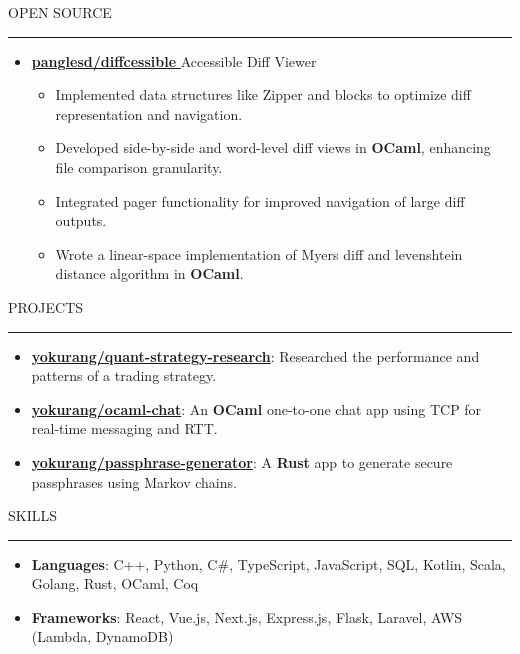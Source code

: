 \documentclass[letterpaper, 11pt]{article}
\def\sectionlineskip{\medskip}
\def\sectionskip{\medskip}
\def \entryspacing {-0pt}
\newcommand{\SectionHeading}[1]{
  \sectionskip
  \raggedright\raggedbottom\MakeUppercase{\large{#1}}
  \sectionlineskip
  \hrule
  \color{black}
}
\newcommand{\ResumeItem}[2]{
  \item{
    \textbf{#1}{: #2 \vspace{-2.835pt}}
  }
}
\newcommand{\ResumeItemDefault}[1]{
  \item{
    #1 \vspace{-2.835pt}
  }
}
\newcommand{\ResumeProjectItem}[3]{
  \item{
    \href{#2}{\textbf{#1}}{: #3 \vspace{-2.835pt}}
  }
}
\newcommand{\ResumeEntryStart}{\begin{itemize}[leftmargin=0mm, label={}]}
\newcommand{\ResumeEntryEnd}{\end{itemize}\vspace{-2.835pt}} %
\newcommand{\ResumeItemListStart}{\begin{itemize}[leftmargin=5mm, label=$\bullet$, itemsep=1mm, parsep=1mm]} %
\newcommand{\ResumeItemListEnd}{\end{itemize}}
\newcommand{\ProjectItemListStart}{\begin{itemize}[leftmargin=*, label=$\bullet$]}
\newcommand{\ProjectItemListEnd}{\end{itemize}\vspace{\entryspacing}}
\newcommand{\OpenSourceProjectItem}[3]{
  \item{
    \href{#1}{\textbf{#2} }\hfill{#3}\vspace{-2.835pt}
  }
}
\begin{document}
  \SectionHeading{Open Source}
  \ResumeEntryStart
  \OpenSourceProjectItem{https://github.com/panglesd/diffcessible}{panglesd/diffcessible}{Accessible Diff Viewer}
  \ResumeItemListStart
  \ResumeItemDefault{Implemented data structures like Zipper and blocks to optimize diff representation and navigation.}
  \ResumeItemDefault{Developed side-by-side and word-level diff views in \textbf{OCaml}, enhancing file comparison granularity.}
  \ResumeItemDefault{Integrated pager functionality for improved navigation of large diff outputs.}
  \ResumeItemDefault{Wrote a linear-space implementation of Myers diff and levenshtein distance algorithm in \textbf{OCaml}.}
  \ResumeItemListEnd
  \ResumeEntryEnd

  \SectionHeading{Projects}
  \ProjectItemListStart
    \ResumeProjectItem{yokurang/quant-strategy-research}
    {https://github.com/yokurang/quant-strategy-research}
    {Researched the performance and patterns of a trading strategy.}
    \ResumeProjectItem{yokurang/ocaml-chat}
    {https://github.com/yokurang/ocaml-chat}
    {An \textbf{OCaml} one-to-one chat app using TCP for real-time messaging and RTT.}
    \ResumeProjectItem{yokurang/passphrase-generator}
    {https://github.com/yokurang/passphrase-generator}
    {A \textbf{Rust} app to generate secure passphrases using Markov chains.}

  \ProjectItemListEnd

  \SectionHeading{Skills}
  \ResumeEntryStart
    \ResumeItem{Languages}{ C++, Python, C\#, TypeScript, JavaScript, SQL, Kotlin, Scala, Golang, Rust, OCaml, Coq }
    \ResumeItem{Frameworks}{ React, Vue.js, Next.js, Express.js, Flask, Laravel, AWS (Lambda, DynamoDB) }
  \ResumeEntryEnd
\end{document}
